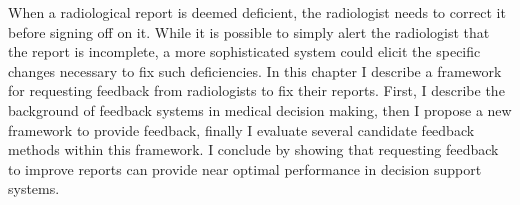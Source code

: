 When a radiological report is deemed deficient, the radiologist needs to correct it before signing off on it. While it is possible to simply alert the radiologist that the report is incomplete, a more sophisticated system could elicit the specific changes necessary to fix such deficiencies. In this chapter I describe a framework for requesting feedback from radiologists to fix their reports. First, I describe the background of feedback systems in medical decision making, then I propose a new framework to provide feedback, finally I evaluate several candidate feedback methods within this framework. I conclude by showing that requesting feedback to improve reports can provide near optimal performance in decision support systems.